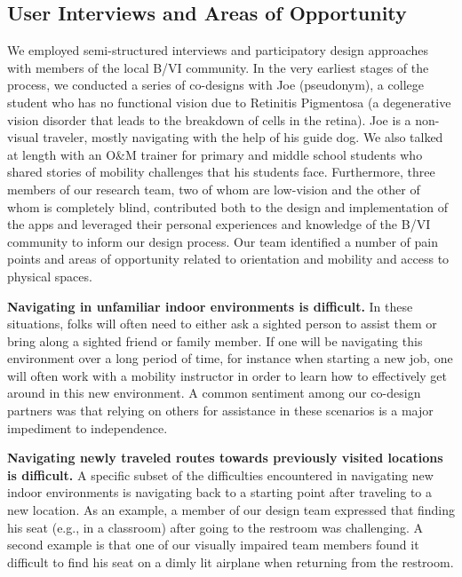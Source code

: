 \documentclass[chi_draft]{sigchi}
\newcommand{\BVI}{B/VI\xspace}
\newcommand{\OM}{O\&M\xspace}
\begin{document}
\subsection{User Interviews and Areas of Opportunity}\label{sec:areasofopportunity}
We employed semi-structured interviews and participatory design approaches \cite{buhler2001empowered, schuler1993participatory} with members of the local \BVI community.  In the very earliest stages of the process, we conducted a series of co-designs with Joe (pseudonym), a college student who has no functional vision due to Retinitis Pigmentosa (a degenerative vision disorder that leads to the breakdown of cells in the retina).  Joe is a non-visual traveler, mostly navigating with the help of his guide dog. We also talked at length with an \OM trainer for primary and middle school students who shared stories of mobility challenges that his students face. Furthermore, three members of our research team, two of whom are low-vision and the other of whom is completely blind, contributed both to the design and implementation of the apps and leveraged their personal experiences and knowledge of the \BVI community to inform our design process. Our team identified a number of pain points and areas of opportunity related to orientation and mobility and access to physical spaces.

\textbf{Navigating in unfamiliar indoor environments is difficult.} In these situations, folks will often need to either ask a sighted person to assist them or bring along a sighted friend or family member.  If one will be navigating this environment over a long period of time, for instance when starting a new job, one will often work with a mobility instructor in order to learn how to effectively get around in this new environment.  A common sentiment among our co-design partners was that relying on others for assistance in these scenarios is a major impediment to independence.

\textbf{Navigating newly traveled routes towards previously visited locations is difficult.} A specific subset of the difficulties encountered in navigating new indoor environments is navigating back to a starting point after traveling to a new location.  As an example, a member of our design team expressed that finding his seat (e.g., in a classroom) after going to the restroom was challenging.  A second example is that one of our visually impaired team members found it difficult to find his seat on a dimly lit airplane when returning from the restroom.
\end{document}

